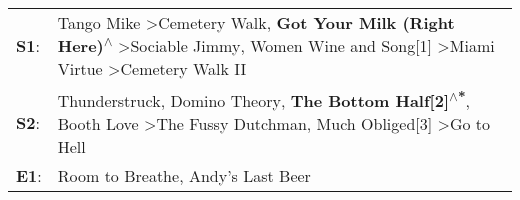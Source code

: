 \begin{supertabular}{p{0.03\textwidth}p{0.92\textwidth}}
 \textbf{S1}:  &  Tango Mike\textsuperscript{} \textgreater \enspace Cemetery Walk\textsuperscript{}, \enspace \textbf{Got Your Milk (Right Here)\textsuperscript{$\wedge$}} \textgreater \enspace Sociable Jimmy\textsuperscript{}, \enspace Women Wine and Song[1]\textsuperscript{} \textgreater \enspace Miami Virtue\textsuperscript{} \textgreater \enspace Cemetery Walk II\textsuperscript{}  \enspace  \\
 \textbf{S2}:  &                                         Thunderstruck\textsuperscript{}, \enspace Domino Theory\textsuperscript{}, \enspace \textbf{The Bottom Half[2]\textsuperscript{$\wedge$*}}, \enspace Booth Love\textsuperscript{} \textgreater \enspace The Fussy Dutchman\textsuperscript{}, \enspace Much Obliged[3]\textsuperscript{} \textgreater \enspace Go to Hell\textsuperscript{}  \enspace  \\
 \textbf{E1}:  &                                                                                                                                                                                                                                                                                                      Room to Breathe\textsuperscript{}, \enspace Andy's Last Beer\textsuperscript{}  \enspace  \\
\end{supertabular}
